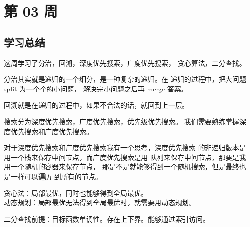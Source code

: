 \newpage
\section{第 03 周}






\subsection{学习总结}

这周学习了分治，回溯，深度优先搜索，广度优先搜索，
贪心算法，二分查找。

分治其实就是递归的一个细分，是一种复杂的递归。在
递归的过程中，把大问题 split 为一个个的小问题，
解决完小问题之后再 merge 答案。

回溯就是在递归的过程中，如果不合法的话，就回到上一层。

搜索分为深度优先搜索，广度优先搜索，优先级优先搜索。
我们需要熟练掌握深度优先搜索和广度优先搜索。

对于深度优先搜索和广度优先搜索我有一个思考，深度优先搜索
的非递归版本是用一个栈来保存中间节点，而广度优先搜索是用
队列来保存中间节点，那要是我用一个随机的容器来保存节点，
那是不是就能够得到一个随机搜索，但是最终也是一样可以遍历
到所有的节点。

贪心法：局部最优，同时也能够得到全局最优。\\
动态规划：局部最优无法得到全局最优时，就需要用动态规划。

二分查找前提：目标函数单调性。存在上下界。能够通过索引访问。
